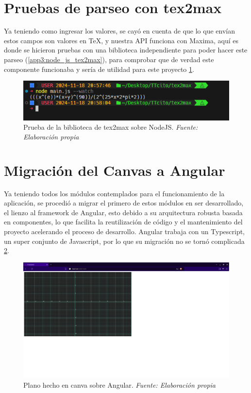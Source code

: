 \section{Pruebas de parseo con tex2max}
Ya teniendo como ingresar los valores, se cayó en cuenta de que lo que envían estos campos son valores en \TeX, y nuestra API funciona con Maxima, aquí es donde se hicieron pruebas con una biblioteca independiente para poder hacer este parseo (\ref{app3:node_js_tex2max}), para comprobar que de verdad este componente funcionaba y sería de utilidad para este proyecto 	\ref{fig:tex2max_node}.
\begin{figure}[H]
	\centering
	\includegraphics[width=1\textwidth]{img/chapter06/tex2max_node.png}
	\caption[Prueba de la biblioteca de tex2max sobre NodeJS.]{Prueba de la biblioteca de tex2max sobre NodeJS. \textit{Fuente: Elaboración propia}}
	\label{fig:tex2max_node}
\end{figure}

\section{Migración del Canvas a Angular}
Ya teniendo todos los módulos contemplados para el funcionamiento de la aplicación, se procedió a migrar el primero de estos módulos en ser desarrollado, el lienzo al framework de Angular, esto debido a su arquitectura robusta basada en componentes, lo que facilita la reutilización de código y el mantenimiento del proyecto acelerando el proceso de desarrollo. Angular trabaja con un Typescript, un super conjunto de Javascript, por lo que su migración no se tornó complicada \ref{fig:prueba_canva_angular}.

\begin{figure}[H]
	\centering
	\includegraphics[width=1\textwidth]{img/chapter06/prueba_canva_angular.png}
	\caption[Plano hecho en canva sobre Angular.]{Plano hecho en canva sobre Angular. \textit{Fuente: Elaboración propia}}
	\label{fig:prueba_canva_angular}
\end{figure}

